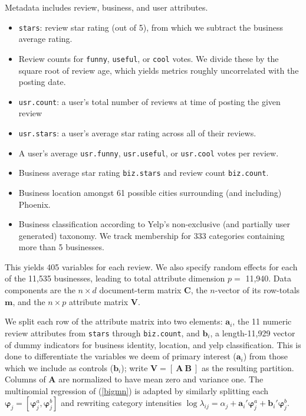 \documentclass[12pt]{article}
\newcommand{\sgl}{\setstretch{1.1}}
\newcommand{\bs}[1]{\boldsymbol{#1}}
\newcommand{\bm}[1]{\mathbf{#1}}
\newcommand{\cd}[1]{{\tt#1}}
\begin{document}
\begin{samepage}
\noindent Metadata
includes review, business, and user attributes.
\begin{itemize}\sgl
\item \cd{stars}: review star rating (out of 5), from which we subtract the business average rating.
\item Review counts for \cd{funny}, \cd{useful}, or \cd{cool} votes.  We divide these by the square root of review age, which yields metrics roughly uncorrelated with the posting date.
\item \cd{usr.count}: a user's total number of reviews at time of posting the given review
\item \cd{usr.stars}: a user's average star rating across all of their reviews.
\item A user's average \cd{usr.funny}, \cd{usr.useful}, or \cd{usr.cool} votes
per review.
\item Business average star rating \cd{biz.stars} and review count \cd{biz.count}.
\item Business location amongst 61 possible cities surrounding (and including) Phoenix.
\item Business classification according to Yelp's non-exclusive (and partially user generated) taxonomy.  We track membership  for 
333 categories  containing more than 5 businesses. 
\end{itemize}\end{samepage}
This yields 405 variables for each review.  We also specify random effects for
each of the 11,535  businesses, leading to total attribute dimension
$p=$ 11,940. Data components are the $n \times d$ document-term matrix $\bm{C}$, the
$n$-vector of its row-totals  $\bm{m}$, and the $n\times p$ attribute matrix
$\bm{V}$.  

We split each row of the attribute matrix into two elements: $\bm{a}_i$, the
11 numeric review attributes from \cd{stars} through
 \cd{biz.count}, and $\bm{b}_i$, a length-11,929 vector of dummy indicators for  business identity,
 location, and yelp classification.    This is done to differentiate the
 variables we deem of primary interest ($\bm{a}_i$) from those which we
 include as controls ($\bm{b}_i$); write $\bm{V} = [~\bm{A}~ \bm{B}~]$ as the
 resulting partition. Columns of $\bm{A}$ are normalized to have mean zero and
 variance one.  The multinomial regression  of (\ref{bigmn}) is adapted by
 similarly splitting each $\bs{\varphi}_j = [ {\bs{\varphi}_j^a},
 {\bs{\varphi}_j^b}]$ and rewriting category intensities
$
\log \lambda_{ij} = \alpha_j + \bm{a}_i'\bs{\varphi}^a_j + \bm{b}_i'\bs{\varphi}^b_j.
$
\end{document}
